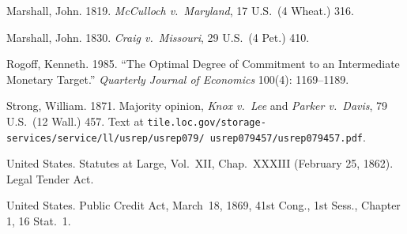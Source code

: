 \documentclass[12pt]{article}
\begin{document}
\begin{description}
\item Marshall, John. 1819. \textit{McCulloch v.\ Maryland}, 17 U.S.\
(4 Wheat.) 316.

\item Marshall, John. 1830. \textit{Craig v.\ Missouri}, 29 U.S.\
(4 Pet.) 410.

\item Rogoff, Kenneth. 1985. ``The Optimal Degree of Commitment to
an Intermediate Monetary Target.'' \textit{Quarterly Journal of
Economics} 100(4): 1169--1189.

\item Strong, William. 1871. Majority opinion, \textit{Knox v.\ Lee}
and \textit{Parker v.\ Davis}, 79 U.S.\ (12 Wall.) 457. Text at
\texttt{tile.loc.gov/storage-services/service/ll/usrep/usrep079/%
usrep079457/usrep079457.pdf}.

\item United States. Statutes at Large, Vol.\ XII, Chap.\ XXXIII
(February 25, 1862). Legal Tender Act.

\item United States. Public Credit Act, March~18, 1869, 41st Cong.,
1st Sess., Chapter 1, 16 Stat.\ 1.

\end{description}
\end{document}
